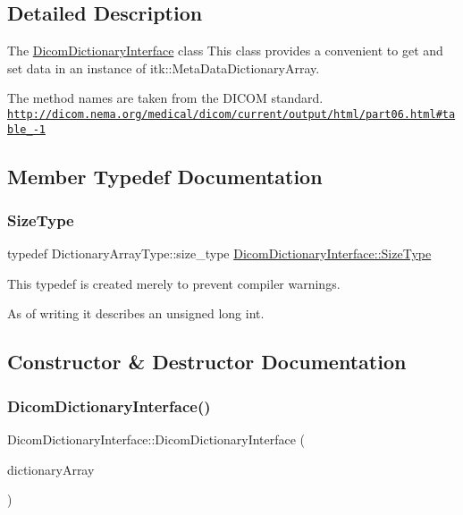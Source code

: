 \subsection{Detailed Description}
The \hyperlink{class_dicom_dictionary_interface}{Dicom\+Dictionary\+Interface} class This class provides a convenient to get and set data in an instance of itk\+::\+Meta\+Data\+Dictionary\+Array. 

The method names are taken from the D\+I\+C\+OM standard. \href{http://dicom.nema.org/medical/dicom/current/output/html/part06.html#table_6-1}{\tt http\+://dicom.\+nema.\+org/medical/dicom/current/output/html/part06.\+html\#table\+\_-\/1} 

\subsection{Member Typedef Documentation}
\mbox{\label{class_dicom_dictionary_interface_a4fde43e0647ab57f29eb2c59c3d051ca}} 
\subsubsection{\texorpdfstring{Size\+Type}{SizeType}}
{\footnotesize\ttfamily typedef Dictionary\+Array\+Type\+::size\+\_\+type \hyperlink{class_dicom_dictionary_interface_a4fde43e0647ab57f29eb2c59c3d051ca}{Dicom\+Dictionary\+Interface\+::\+Size\+Type}}



This typedef is created merely to prevent compiler warnings. 

As of writing it describes an unsigned long int. 

\subsection{Constructor \& Destructor Documentation}
\mbox{\label{class_dicom_dictionary_interface_a8c97276448308399415acccb9608af44}} 
\subsubsection{\texorpdfstring{Dicom\+Dictionary\+Interface()}{DicomDictionaryInterface()}}
{\footnotesize\ttfamily Dicom\+Dictionary\+Interface\+::\+Dicom\+Dictionary\+Interface (\begin{DoxyParamCaption}\item[{Dicom\+Dictionary\+Interface\+::\+Dictionary\+Array\+Type}]{dictionary\+Array }\end{DoxyParamCaption})}



